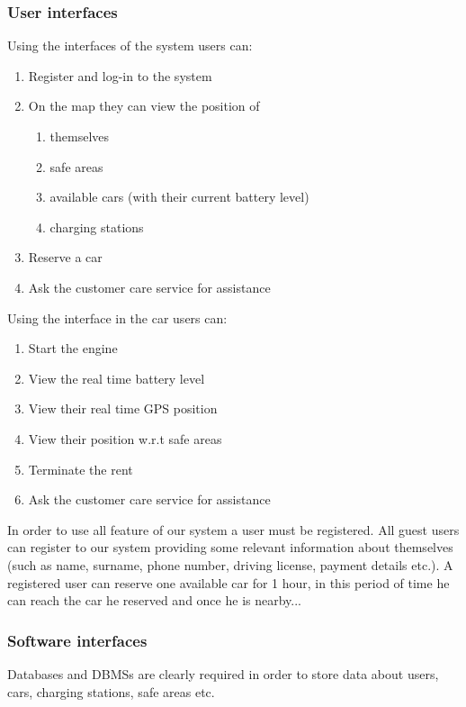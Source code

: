 \subsubsection{User interfaces}
	Using the interfaces of the system users can:
	\begin{enumerate}
		\item Register and log-in to the system
		\item On the map they can view the position of
			\begin{enumerate}[label=\alph*)]
				\item themselves
				\item safe areas
				\item available cars (with their current battery level)
				\item charging stations
			\end{enumerate}
		\item Reserve a car
		\item Ask the customer care service for assistance 
	\end{enumerate}
	Using the interface in the car users can:
	\begin{enumerate}
		\item Start the engine
		\item View the real time battery level
		\item View their real time GPS position
		\item View their position w.r.t safe areas
		\item Terminate the rent
		\item Ask the customer care service for assistance
	\end{enumerate}			


	In order to use all feature of our system a user must be registered. All guest users can register to our system providing some relevant information about themselves (such as name, surname, phone number, driving license, payment details etc.). A registered user can reserve one available car for 1 hour, in this period of time he can reach the car he reserved and once he is nearby...

\subsubsection{Software interfaces}
	Databases and DBMSs are clearly required in order to store data about users, cars, charging stations, safe areas etc.
	
